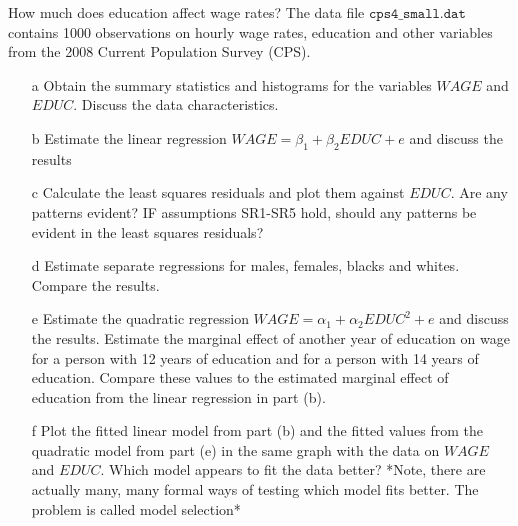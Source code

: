 \documentclass[xcolor={dvipsnames}]{beamer}
\begin{document}
\begin{frame}{2.15}


How much does education affect wage rates? The data file $\texttt{cps4\_small.dat}$ contains 1000 observations on hourly wage rates, education and other variables from the 2008 Current Population Survey (CPS).
\begin{itemize}[<+->]
\item[a] Obtain the summary statistics and histograms for the variables $WAGE$ and 
$EDUC$. Discuss the data characteristics.

\item[b] Estimate the linear regression $WAGE = \beta_1 + \beta_2EDUC + e$ and discuss the results

\item[c] Calculate the least squares residuals and plot them against $EDUC$. Are any patterns evident? IF assumptions SR1-SR5 hold, should any patterns be evident in the least squares residuals?

\item[d]
Estimate separate regressions for males, females, blacks and whites. Compare the results.
\end{itemize}
\end{frame}

\begin{frame}
\begin{itemize}[<+->]
\item[e]
Estimate the quadratic regression $WAGE = \alpha_1 + \alpha_2 EDUC^2 + e$ and discuss the results. Estimate the marginal effect of another year of education on wage for a person with 12 years of education and for a person with 14 years of education. Compare these values to the estimated marginal effect of education from the linear regression in part (b). 

\item[f] Plot the fitted linear model from part (b) and the fitted values from the quadratic model from part (e) in the same graph with the data on $WAGE$ and $EDUC$. Which model appears to fit the data better? *Note, there are actually many, many formal ways of testing which model fits better. The problem is called model selection*
	\end{itemize}
\end{frame}
\end{document}
